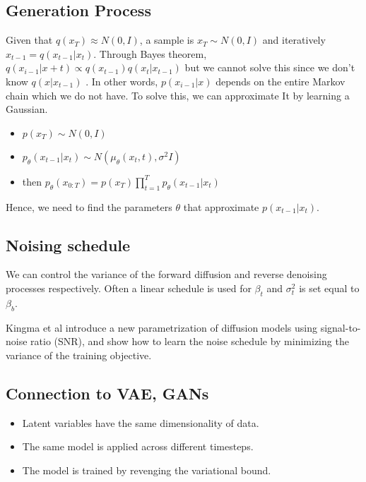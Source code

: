 \documentclass[11pt]{article}
\begin{document}
\subsection{Generation Process}\label{generation-process}

Given that \(q(x_T)\approx N(0, I)\), a sample is \(x_T\sim N(0, I)\)
and iteratively \(x_{t-1}=q(x_{t-1}|x_t)\). Through Bayes theorem,
\(q(x_{i-1}|x+t) \propto q(x_{t-1})q(x_t|x_{t-1})\) but we cannot solve
this since we don't know \(q(x|x_{t-1})\) . In other words,
\(p(x_{i-1}|x)\) depends on the entire Markov chain which we do not
have. To solve this, we can approximate It by learning a Gaussian.

\begin{itemize}
\tightlist
\item
  \(p(x_T)\sim N(0, I)\)
\item
  \(p_{\theta}(x_{t-1}|x_t)\sim N(\mu_{\theta}(x_t, t), \sigma^2 I)\)
\item
  then
  \(p_{\theta}(x_{0:T})=p(x_T)\prod_{t=1}^{T}p_{\theta}(x_{t-1}|x_t)\)
\end{itemize}

Hence, we need to find the parameters \(\theta\) that approximate
\(p(x_{t-1}|x_t)\).

\subsection{Noising schedule}\label{noising-schedule}

We can control the variance of the forward diffusion and reverse
denoising processes respectively. Often a linear schedule is used for
\(\beta_t\) and \(\sigma^2_t\) is set equal to \(\beta_b\).

Kingma et al introduce a new parametrization of diffusion models using
signal-to-noise ratio (SNR), and show how to learn the noise schedule by
minimizing the variance of the training objective.

\subsection{Connection to VAE, GANs}\label{connection-to-vae-gans}

\begin{itemize}
\tightlist
\item
  Latent variables have the same dimensionality of data.
\item
  The same model is applied across different timesteps.
\item
  The model is trained by revenging the variational bound.
\end{itemize}
\end{document}
